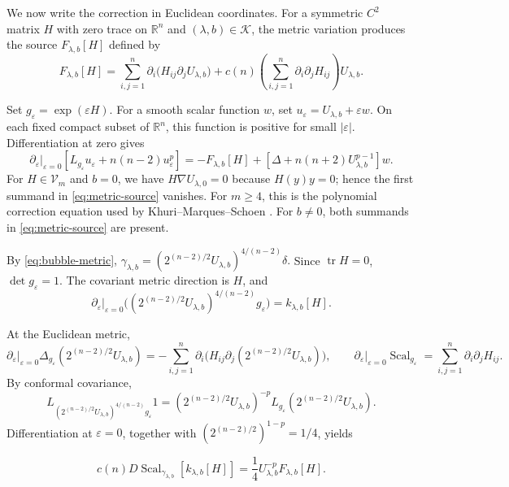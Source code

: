 \documentclass[11pt]{article}
\numberwithin{equation}{section}
\theoremstyle{remark}
\newcommand{\R}{\mathbb R}
\newcommand{\eps}{\varepsilon}
\DeclareMathOperator{\tr}{tr}
\begin{document}
We now write the correction in Euclidean coordinates.
For a symmetric \(C^2\) matrix \(H\) with zero trace on \(\R^n\) and
\((\lambda,b)\in\mathcal K\), the metric variation produces the source
\(F_{\lambda,b}[H]\) defined by
\begin{equation}\label{eq:metric-source}
 F_{\lambda,b}[H]
 =\sum_{i,j=1}^n
 \partial_i\bigl(H_{ij}\partial_jU_{\lambda,b}\bigr)
 +c(n)\left(\sum_{i,j=1}^n\partial_i\partial_jH_{ij}\right)
 U_{\lambda,b}.
\end{equation}

{Set \(g_\eps=\exp(\eps H)\).}
For a smooth scalar function \(w\), set
\(u_\eps=U_{\lambda,b}+\eps w\). On each fixed compact subset of
\(\R^n\), this function is positive for small \(|\eps|\).
Differentiation at zero gives
\[
 \left.\partial_\eps\right|_{\eps=0}
 \left[L_{g_\eps}u_\eps+n(n-2)u_\eps^p\right]
 =-F_{\lambda,b}[H]
 +\left[\Delta+n(n+2)U_{\lambda,b}^{p-1}\right]w.
\]
{For \(H\in\mathcal V_m\) and \(b=0\), we have
\(H\nabla U_{\lambda,0}=0\) because \(H(y)y=0\); hence the first summand in}
\eqref{eq:metric-source} vanishes. For \(m\ge4\), {this is the
polynomial correction equation used by Khuri--Marques--Schoen
\cite[Proposition  4.1, Lemma  4.2, and (4.3)--(4.5)]{KMS}.} For \(b\ne0\), both summands in
\eqref{eq:metric-source} are present.

{By \eqref{eq:bubble-metric},
\(\gamma_{\lambda,b}
=(2^{(n-2)/2}U_{\lambda,b})^{4/(n-2)}\delta\).}
Since \(\tr H=0\), \(\det g_\eps=1\).  The covariant metric direction is
\(H\), and
\[
 \left.\partial_\eps\right|_{\eps=0}
 \bigl((2^{(n-2)/2}U_{\lambda,b})^{4/(n-2)}g_\eps\bigr)
 =k_{\lambda,b}[H].
\]

At the Euclidean metric,
\[
 \left.\partial_\eps\right|_{\eps=0}
 \Delta_{g_\eps}(2^{(n-2)/2}U_{\lambda,b})
 =-\sum_{i,j=1}^n\partial_i
 \bigl(H_{ij}\partial_j(2^{(n-2)/2}U_{\lambda,b})\bigr),
 \qquad
 \left.\partial_\eps\right|_{\eps=0}\operatorname{Scal}_{g_\eps}
 =\sum_{i,j=1}^n\partial_i\partial_jH_{ij}.
\]
{By conformal covariance,}
\[
 L_{(2^{(n-2)/2}U_{\lambda,b})^{4/(n-2)}g_\eps}1
 =(2^{(n-2)/2}U_{\lambda,b})^{-p}
 L_{g_\eps}(2^{(n-2)/2}U_{\lambda,b}).
\]
Differentiation at \(\eps=0\), together with
\((2^{(n-2)/2})^{1-p}=1/4\), yields

\begin{equation}\label{eq:curvature-source-relation}
 c(n)D\!\operatorname{Scal}_{\gamma_{\lambda,b}}[k_{\lambda,b}[H]]
 =\frac14U_{\lambda,b}^{-p}F_{\lambda,b}[H].
\end{equation}
\end{document}
